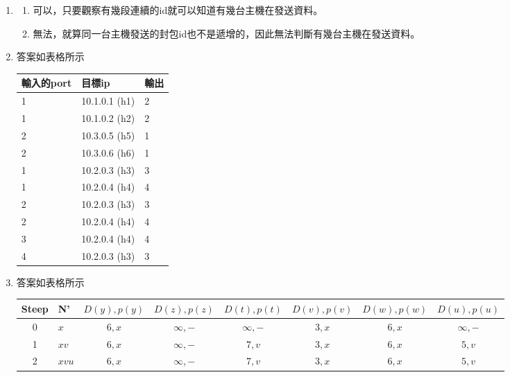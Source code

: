 \documentclass[12pt,a4paper]{article}
\begin{document}
\begin{enumerate}
\begin{enumerate}
    \end{enumerate}
    \item \begin{enumerate}
        \item 可以，只要觀察有幾段連續的id就可以知道有幾台主機在發送資料。
        \item 無法，就算同一台主機發送的封包id也不是遞增的，因此無法判斷有幾台主機在發送資料。
        \end{enumerate}
        
    \newpage
    \item 答案如表格所示
    \begin{table}[H]
    \centering
    \begin{tabular}{|l|l|l|}
    \hline
    \textbf{輸入的port} & \textbf{目標ip} & \textbf{輸出} \\ \hline
    1 & 10.1.0.1 (h1) & 2 \\ \hline
    1 & 10.1.0.2 (h2) & 2 \\ \hline
    2 & 10.3.0.5 (h5) & 1 \\ \hline
    2 & 10.3.0.6 (h6) & 1 \\ \hline
    1 & 10.2.0.3 (h3) & 3 \\ \hline
    1 & 10.2.0.4 (h4) & 4 \\ \hline
    2 & 10.2.0.3 (h3) & 3 \\ \hline
    2 & 10.2.0.4 (h4) & 4 \\ \hline
    3 & 10.2.0.4 (h4) & 4 \\ \hline
    4 & 10.2.0.3 (h3) & 3 \\ \hline
    \end{tabular}
    \end{table}
    \item 答案如表格所示
    \begin{table}[H]
    \centering
    \begin{tabular}{|c|l|c|c|c|c|c|c|}
    \hline
    Steep & N' & $D(y),p(y)$   & $D(z),p(z)$   & $D(t),p(t)$   & $D(v),p(v)$   & $D(w),p(w)$   & $D(u),p(u)$   \\ \hline
    0 & $x$              & $6,x$         & $\infty,-$    & $\infty,-$    & $3,x$         & $6,x$         & $\infty,-$    \\ \hline
    1 & $xv$             & $6,x$         & $\infty,-$    & $7,v$         & $3,x$         & $6,x$         & $5,v$         \\ \hline
    2 & $xvu$            & $6,x$         & $\infty,-$    & $7,v$         & $3,x$         & $6,x$         & $5,v$         \\ \hline

\end{tabular}
\end{table}
\end{enumerate}
\end{document}

